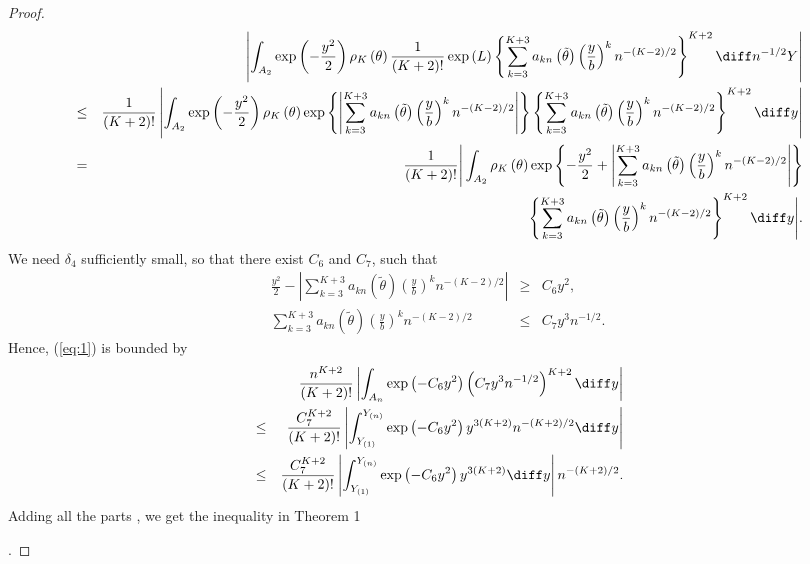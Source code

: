 \begin{proof}
\begin{eqnarray}
 &  & \left|\int_{A_{2}}\exp\left(-\frac{y^{2}}{2}\right)\rho_{K}\left(\theta\right)\frac{1}{\left(K+2\right)!}\exp\left(L\right)\left\{ \sum_{k=3}^{K+3}a_{kn}\left(\tilde{\theta}\right)\left(\frac{y}{b}\right)^{k}n^{-\left(K-2\right)/2}\right\} ^{K+2}\diff n^{-1/2}Y\right|\label{eq:1}\\
 & \le & \frac{1}{\left(K+2\right)!}\left|\int_{A_{2}}\exp\left(-\frac{y^{2}}{2}\right)\rho_{K}\left(\theta\right)\exp\left\{ \left|\sum_{k=3}^{K+3}a_{kn}\left(\tilde{\theta}\right)\left(\frac{y}{b}\right)^{k}n^{-\left(K-2\right)/2}\right|\right\} \left\{ \sum_{k=3}^{K+3}a_{kn}\left(\tilde{\theta}\right)\left(\frac{y}{b}\right)^{k}n^{-\left(K-2\right)/2}\right\} ^{K+2}\diff y\right|\nonumber \\
 & = & \frac{1}{\left(K+2\right)!}\Bigg|\int_{A_{2}}\rho_{K}\left(\theta\right)\exp\left\{ -\frac{y^{2}}{2}+\left|\sum_{k=3}^{K+3}a_{kn}\left(\tilde{\theta}\right)\left(\frac{y}{b}\right)^{k}n^{-\left(K-2\right)/2}\right|\right\} \nonumber \\
 &  & \left\{ \sum_{k=3}^{K+3}a_{kn}\left(\tilde{\theta}\right)\left(\frac{y}{b}\right)^{k}n^{-\left(K-2\right)/2}\right\} ^{K+2}\diff y\Bigg|.\nonumber 
\end{eqnarray}
We need $\delta_{4}$ sufficiently small, so that there exist $C_{6}$
and $C_{7}$, such that 
\begin{eqnarray*}
\frac{y^{2}}{2}-\left|\sum_{k=3}^{K+3}a_{kn}\left(\tilde{\theta}\right)\left(\frac{y}{b}\right)^{k}n^{-\left(K-2\right)/2}\right| & \ge & C_{6}y^{2},\\
\sum_{k=3}^{K+3}a_{kn}\left(\tilde{\theta}\right)\left(\frac{y}{b}\right)^{k}n^{-\left(K-2\right)/2} & \le & C_{7}y^{3}n^{-1/2}.
\end{eqnarray*}
 Hence, (\ref{eq:1}) is bounded by 
\begin{eqnarray*}
 &  & \frac{n^{K+2}}{\left(K+2\right)!}\left|\int_{A_{n}}\exp\left(-C_{6}y^{2}\right)\left(C_{7}y^{3}n^{-1/2}\right)^{K+2}\diff y\right|\\
 & \le & \frac{C_{7}^{K+2}}{\left(K+2\right)!}\left|\int_{Y_{\left(1\right)}}^{Y_{\left(n\right)}}\exp\left(-C_{6}y^{2}\right)y^{3\left(K+2\right)}n^{-\left(K+2\right)/2}\diff y\right|\\
 & \le & \frac{C_{7}^{K+2}}{\left(K+2\right)!}\left|\int_{Y_{\left(1\right)}}^{Y_{\left(n\right)}}\exp\left(-C_{6}y^{2}\right)y^{3\left(K+2\right)}\diff y\right|n^{-\left(K+2\right)/2}.
\end{eqnarray*}
Adding all the parts , we get the inequality in Theorem 1
\begin{comment}
add ref to main theorem
\end{comment}
.
\end{proof}


